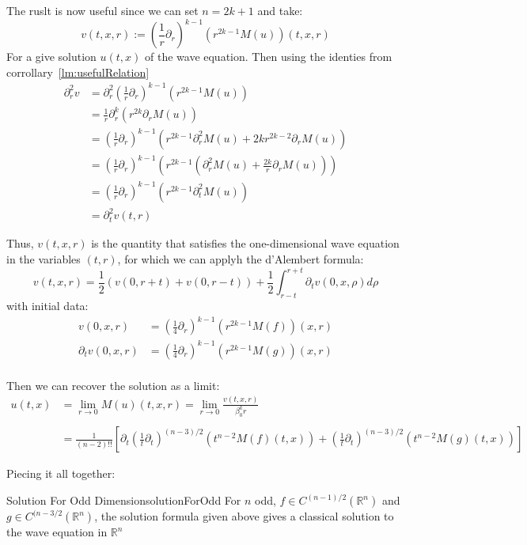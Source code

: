 \documentclass{book}
\newcommand{\R}{{\mathbb{R}}}
\newcommand{\rw}{\rightarrow}
\begin{document}
The ruslt is now useful since we can set $n = 2k + 1$ and take:
\[
	v(t,x,r) :=  \left(  \frac{1}{r}  \partial_r \right)^{k-1} \left( r^{2k-1} M(u) \right) (t,x,r)
\]
For a give solution $u(t,x)$ of the wave equation. Then using the identies from corrollary~\ref{lm:usefulRelation}
\begin{align*}
	\partial_r^2 v &=	  \partial_r^2 \left(  \frac{1}{r}  \partial_r \right)^{k-1} \left( r^{2k-1} M(u) \right)\\
	&= \frac{1}{r}  \partial_r^k \left(  r^{2k}  \partial_r M(u) \right)\\
	&= \left( \frac{1}{r}  \partial_r \right)^{k-1}  \left( r^{2k-1}  \partial_r^2 M(u) + 2kr^{2k-2}  \partial_r M(u)
	\right)\\
	&=\left( \frac{1}{r}  \partial_r \right)^{k-1} \left( r^{2k-1} \left(  \partial_r^2 M(u) + \frac{2k}{r}  \partial_r M(u)\right) \right)\\
	&= \left( \frac{1}{r}  \partial_r \right)^{k-1} \left( r^{2k-1}  \partial_t^2 M(u) \right)\\
	&=  \partial_t^2 v(t,r)
\end{align*}

Thus, $v(t,x,r)$ is the quantity that satisfies the one-dimensional wave equation in the variables $(t,r)$, for which we
can applyh the d'Alembert formula:
\[
	v(t,x,r) = \frac{1}{2} \left(v(0,r+t) + v(0, r-t)\right) + \frac{1}{2} \int_{r-t}^{r+t}  \partial_t v(0,x,
	\rho)d\rho
\]
with initial data:
\begin{align*}
	v(0,x,r) &= \left(  \frac{1}{4}  \partial_r \right)^{k-1} \left( r^{2k-1} M(f) \right) (x,r)\\
	 \partial_tv(0,x,r) &= \left(  \frac{1}{4}  \partial_r \right)^{k-1} \left( r^{2k-1} M(g) \right) (x,r)\\
\end{align*}

Then we can recover the solution as a limit:
\begin{align*}
	u(t,x) &= \lim_{r \rw 0} M(u)(t,x,r) = \lim_{r \rw 0} \frac{v(t,x,r)}{\beta_0^kr}\\\\
		   &= \frac{1}{(n-2)!!} \left[  \partial_t \left(  \frac{1}{t}  \partial_t \right)^{(n-3)/2} \left( t^{n-2}
		   M(f)(t,x) \right) + \left(  \frac{1}{t}  \partial_t \right)^{(n-3)/2} \left(t^{n-2} M(g)(t,x)\right)\right]
\end{align*}

Piecing it all together:

\begin{thm}{Solution For Odd Dimension}{solutionForOdd}
	For $n$ odd, $f \in C^{(n-1)/2}(\R^n)$ and $g \in C^{(n-3/2}(\R^n)$, the solution formula given above gives
		a classical solution to the wave equation in $\R^n$
\end{thm}
\end{document}
